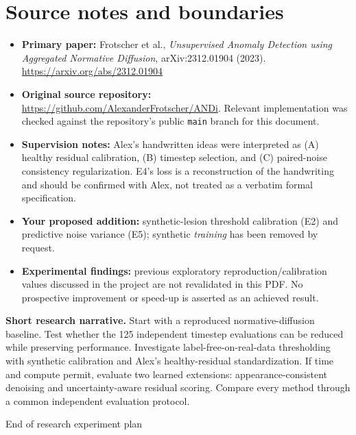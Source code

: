 \documentclass[10pt,a4paper]{article}
\newcommand{\file}[1]{\nolinkurl{#1}}
\begin{document}
\section{Source notes and boundaries}
\begin{itemize}
\item \textbf{Primary paper:} Frotscher et al., \emph{Unsupervised Anomaly Detection using Aggregated Normative Diffusion}, arXiv:2312.01904 (2023). \url{https://arxiv.org/abs/2312.01904}
\item \textbf{Original source repository:} \url{https://github.com/AlexanderFrotscher/ANDi}. Relevant implementation was checked against the repository's public \file{main} branch for this document.
\item \textbf{Supervision notes:} Alex's handwritten ideas were interpreted as (A) healthy residual calibration, (B) timestep selection, and (C) paired-noise consistency regularization. E4's loss is a reconstruction of the handwriting and should be confirmed with Alex, not treated as a verbatim formal specification.
\item \textbf{Your proposed addition:} synthetic-lesion threshold calibration (E2) and predictive noise variance (E5); synthetic \emph{training} has been removed by request.
\item \textbf{Experimental findings:} previous exploratory reproduction/calibration values discussed in the project are not revalidated in this PDF. No prospective improvement or speed-up is asserted as an achieved result.
\end{itemize}
\begin{summarybox}
\textbf{Short research narrative.} Start with a reproduced normative-diffusion baseline. Test whether the 125 independent timestep evaluations can be reduced while preserving performance. Investigate label-free-on-real-data thresholding with synthetic calibration and Alex's healthy-residual standardization. If time and compute permit, evaluate two learned extensions: appearance-consistent denoising and uncertainty-aware residual scoring. Compare every method through a common independent evaluation protocol.
\end{summarybox}
\vfill
\begin{center}\small\color{slate} End of research experiment plan\end{center}
\end{document}
